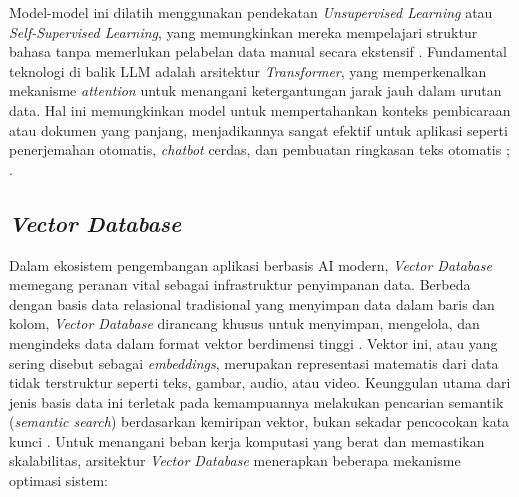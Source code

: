 Model-model ini dilatih menggunakan pendekatan \textit{Unsupervised Learning} atau \textit{Self-Supervised Learning}, yang memungkinkan mereka mempelajari struktur bahasa tanpa memerlukan pelabelan data manual secara ekstensif \parencite{Brown2020Language}. Fundamental teknologi di balik LLM adalah arsitektur \textit{Transformer}, yang memperkenalkan mekanisme \textit{attention} untuk menangani ketergantungan jarak jauh dalam urutan data. Hal ini memungkinkan model untuk mempertahankan konteks pembicaraan atau dokumen yang panjang, menjadikannya sangat efektif untuk aplikasi seperti penerjemahan otomatis, \textit{chatbot} cerdas, dan pembuatan ringkasan teks otomatis \parencite{Vaswani2017Attention}; \parencite{Naveed2023Comprehensive}.

\subsection{\textit{Vector Database}}
Dalam ekosistem pengembangan aplikasi berbasis AI modern, \textit{Vector Database} memegang peranan vital sebagai infrastruktur penyimpanan data. Berbeda dengan basis data relasional tradisional yang menyimpan data dalam baris dan kolom, \textit{Vector Database} dirancang khusus untuk menyimpan, mengelola, dan mengindeks data dalam format vektor berdimensi tinggi \parencite{Pan2023Large}. Vektor ini, atau yang sering disebut sebagai \textit{embeddings}, merupakan representasi matematis dari data tidak terstruktur seperti teks, gambar, audio, atau video.
Keunggulan utama dari jenis basis data ini terletak pada kemampuannya melakukan pencarian semantik (\textit{semantic search}) berdasarkan kemiripan vektor, bukan sekadar pencocokan kata kunci \parencite{Wang2024Vector}.
Untuk menangani beban kerja komputasi yang berat dan memastikan skalabilitas, arsitektur \textit{Vector Database} menerapkan beberapa mekanisme optimasi sistem:

